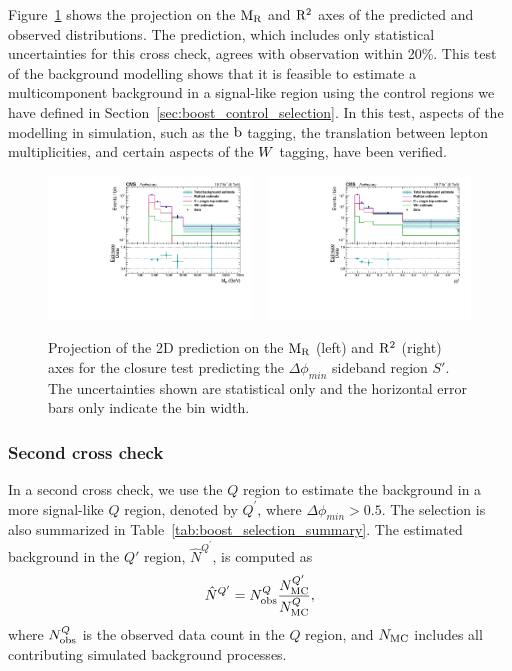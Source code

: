 Figure~\ref{fig:Shape_syst_1D_project_sideband} shows the projection on the $\mathrm{M_R}$ and $\mathrm{R^2}$ axes of
the predicted and observed distributions.  The prediction, which includes only statistical
uncertainties for this cross check, agrees with observation within 20\%. This
test of the background modelling shows that it is feasible to estimate a multicomponent 
background in a signal-like region using the control regions we have defined in
Section~\ref{sec:boost_control_selection}.
In this test, aspects of the modelling in simulation, such as the $\mathrm{b}$ tagging, the translation
between lepton multiplicities, and certain aspects of the $W$ tagging, have been verified. 

\begin{figure}[tpb]
\includegraphics[width=0.48\textwidth]
{figures/razor_selection/MR_comparison_data_estimate_g1Mbg1W0Ll_mdPhi0p5_log}
~
\includegraphics[width=0.48\textwidth]
{figures/razor_selection/R2_comparison_data_estimate_g1Mbg1W0Ll_mdPhi0p5_log}
\caption{Projection of the 2D prediction on the $\mathrm{M_R}$ (left) and $\mathrm{R^2}$ (right) axes for the closure
test predicting the $\Delta\phi_{min}$ sideband region $S'$. The uncertainties shown are statistical
only and the horizontal error bars only indicate the bin width.
\label{fig:Shape_syst_1D_project_sideband}}
\end{figure}


\subsubsection{Second cross check}

In a second cross check, we use the $Q$ region to estimate the background in a more signal-like $Q$
region, denoted by $Q^\prime$, where $\Delta\phi_{min} > 0.5$. 
The selection is also summarized in Table~\ref{tab:boost_selection_summary}. 
The estimated background in the $Q'$ region, $\hat{N}^{Q^\prime}$, is computed as
\begin{equation}
  \hat{N}^{Q^\prime} = N_{\rm obs}^Q \frac{N_{\rm MC}^{Q^\prime}}{N_{\rm MC}^Q},
\end{equation}
where $N_{\rm obs}^Q$ is the observed data count in the $Q$ region, and
$N_{\rm MC}$ includes all contributing simulated background processes.

